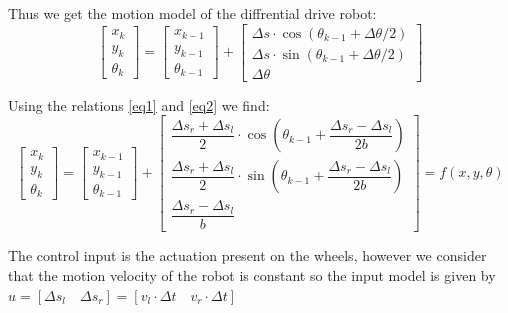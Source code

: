 \documentclass[11pt,a4paper]{report}
\begin{document}
\begin{enumerate}
Thus we get the motion model of the diffrential drive robot:
$$ \left [ \begin{array}{c} x_{k} \\ y_{k} \\ \theta_{k} \end{array}\right ]= 
\left [ \begin{array}{c} x_{k-1} \\ y_{k-1} \\ \theta_{k-1} \end{array}\right ] + 
\left [ \begin{array}{c} \Delta s \cdot \cos (\theta_{k-1} + \Delta \theta /2) \\ \Delta s \cdot \sin (\theta_{k-1} + \Delta \theta /2) \\ \Delta \theta \end{array}\right ]$$  

Using the relations \ref{eq1} and \ref{eq2} we find:
$$ \left [ \begin{array}{c} x_{k} \\ y_{k} \\ \theta_{k} \end{array}\right ]= 
\left [ \begin{array}{c} x_{k-1} \\ y_{k-1} \\ \theta_{k-1} \end{array}\right ] + 
\left [ \begin{array}{c} \dfrac{\Delta s_{r} + \Delta s_{l}}{2} \cdot \cos (\theta_{k-1} + \dfrac{\Delta s_{r} - \Delta s_{l}}{2b} ) \\ \dfrac{\Delta s_{r} + \Delta s_{l}}{2} \cdot \sin (\theta_{k-1} + \dfrac{\Delta s_{r} - \Delta s_{l}}{2b}) \\ \dfrac{\Delta s_{r} - \Delta s_{l}}{b} \end{array}\right ] = f(x, y, \theta) $$  

The control input is the actuation present on the wheels, however we consider that the motion velocity of the robot is constant so the input model is given by $ u = [\Delta s_{l} \quad \Delta s_{r}] = [v_{l} \cdot \Delta t \quad v_{r} \cdot \Delta t]$	


\end{enumerate}
\end{document}
